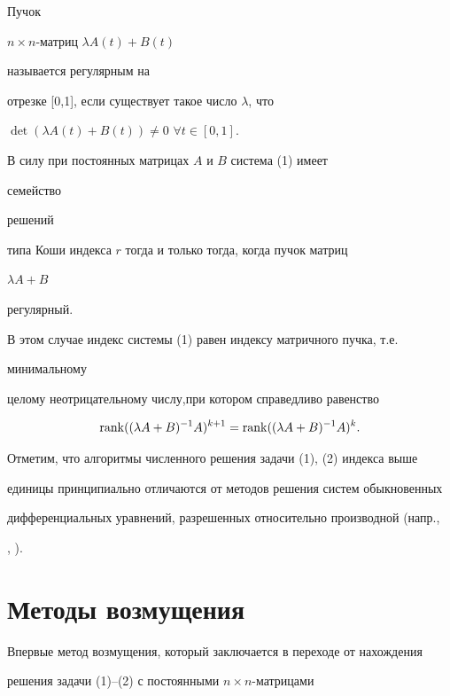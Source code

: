 \begin{defn} Пучок


$n\times n$-матриц $\lambda A(t)+B(t)$


называется регулярным на


отрезке [0,1], если существует такое число $\lambda$, что


$\det(\lambda A(t)+B(t))\ne 0$ $\forall t\in[0,1]$.


\end{defn}





В силу \cite{Boy} при постоянных матрицах $A$ и $B$ система (1) имеет


семейство


решений


типа Коши индекса $r$ тогда и только тогда, когда пучок матриц


$\lambda A+B$


регулярный.


В этом случае индекс системы (1) равен индексу матричного пучка, т.е.


минимальному


целому неотрицательному числу,при котором справедливо равенство


$$


\rank((\lambda A+B)^{-1}A)^{k+1}=\rank((\lambda A+B)^{-1}A)^k.


$$





Отметим, что алгоритмы численного решения задачи (1), (2) индекса выше


единицы принципиально отличаются от методов решения систем обыкновенных


дифференциальных уравнений, разрешенных относительно производной (напр.,


\cite{Boy}, \cite{Chi}).





\section{Методы возмущения}





Впервые метод возмущения, который заключается в переходе от нахождения


решения задачи (1)--(2) с постоянными $n\times n$-матрицами


